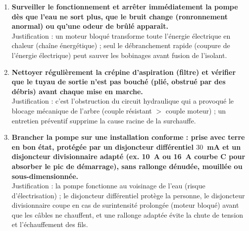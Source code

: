 \documentclass[11pt]{article}
\newcounter{popsec}
\newcounter{popsub}
\newcommand{\courssub}[1]{%
  \stepcounter{popsub}%
  \par\vspace{9pt}\noindent{\popxbold\fontsize{11.5}{13}\selectfont\color{popink}{\color{poporange}\thepopsec.\thepopsub}\hspace{6pt}#1}\par\nopagebreak\vspace{4pt}
}
\begin{document}
\begin{exoresolu}
\begin{enumerate}
\item \textbf{Surveiller le fonctionnement et arrêter immédiatement la pompe dès que l'eau ne sort plus, que le bruit change (ronronnement anormal) ou qu'une odeur de brûlé apparaît.} \\
Justification : un moteur bloqué transforme toute l'énergie électrique en chaleur (chaîne énergétique) ; seul le débranchement rapide (coupure de l'énergie électrique) peut sauver les bobinages avant fusion de l'isolant.
\item \textbf{Nettoyer régulièrement la crépine d'aspiration (filtre) et vérifier que le tuyau de sortie n'est pas bouché (plié, obstrué par des débris) avant chaque mise en marche.} \\
Justification : c'est l'obstruction du circuit hydraulique qui a provoqué le blocage mécanique de l'arbre (couple résistant $>$ couple moteur) ; un entretien préventif supprime la cause racine de la surchauffe.
\item \textbf{Brancher la pompe sur une installation conforme : prise avec terre en bon état, protégée par un disjoncteur différentiel $30$~mA et un disjoncteur divisionnaire adapté (ex. \SI{10}{A} ou \SI{16}{A} courbe C pour absorber le pic de démarrage), sans rallonge dénudée, mouillée ou sous-dimensionnée.} \\
Justification : la pompe fonctionne au voisinage de l'eau (risque d'électrisation) ; le disjoncteur différentiel protège la personne, le disjoncteur divisionnaire coupe en cas de surintensité prolongée (moteur bloqué) avant que les câbles ne chauffent, et une rallonge adaptée évite la chute de tension et l'échauffement des fils.
\end{enumerate}
\end{exoresolu}

\courssub{Bilan de la leçon}
\end{document}
